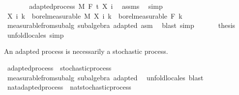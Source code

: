 \begin{isabellebody}
\ \ \ \ \isamarkupfalse%
\ \isamarkupfalse%
\ adapted{\isacharunderscore}{\kern0pt}process\ M\ F\ t\ {\isachardoublequoteopen}X\ i{\isachardoublequoteclose}\ \isamarkupfalse%
\ assms\ \isamarkupfalse%
\ simp\isanewline
\ \ \ \ \isamarkupfalse%
\ {\isachardoublequoteopen}X\ i\ k\ {\isasymin}\ borel{\isacharunderscore}{\kern0pt}measurable\ M{\isachardoublequoteclose}\ {\isachardoublequoteopen}X\ i\ k\ {\isasymin}\ borel{\isacharunderscore}{\kern0pt}measurable\ {\isacharparenleft}{\kern0pt}F\ k{\isacharparenright}{\kern0pt}{\isachardoublequoteclose}\ \isamarkupfalse%
\ measurable{\isacharunderscore}{\kern0pt}from{\isacharunderscore}{\kern0pt}subalg\ subalgebra\ adapted\ asm\ \isamarkupfalse%
\ {\isacharparenleft}{\kern0pt}blast{\isacharcomma}{\kern0pt}\ simp{\isacharparenright}{\kern0pt}\isanewline
\ \ \isacommand{{\isacharbraceright}{\kern0pt}}\isamarkupfalse%
\isanewline
\ \ \isamarkupfalse%
\ {\isacharquery}{\kern0pt}thesis\ \isamarkupfalse%
\ {\isacharparenleft}{\kern0pt}unfold{\isacharunderscore}{\kern0pt}locales{\isacharparenright}{\kern0pt}\ simp\isanewline
{}\isamarkupfalse%
%
\endisatagproof
{\isafoldproof}%
%
\isadelimproof
%
\endisadelimproof
%
\begin{isamarkuptext}%
An adapted process is necessarily a stochastic process.%
\end{isamarkuptext}\isamarkuptrue%
\isamarkupfalse%
\ adapted{\isacharunderscore}{\kern0pt}process\ {\isasymsubseteq}\ stochastic{\isacharunderscore}{\kern0pt}process%
\isadelimproof
\ %
\endisadelimproof
%
\isatagproof
{}\isamarkupfalse%
\ measurable{\isacharunderscore}{\kern0pt}from{\isacharunderscore}{\kern0pt}subalg\ subalgebra\ adapted\ \isamarkupfalse%
\ {\isacharparenleft}{\kern0pt}unfold{\isacharunderscore}{\kern0pt}locales{\isacharparenright}{\kern0pt}\ blast%
\endisatagproof
{\isafoldproof}%
%
\isadelimproof
%
\endisadelimproof
\isanewline
\isanewline
{}\isamarkupfalse%
\ nat{\isacharunderscore}{\kern0pt}adapted{\isacharunderscore}{\kern0pt}process\ {\isasymsubseteq}\ nat{\isacharunderscore}{\kern0pt}stochastic{\isacharunderscore}{\kern0pt}process%
\isadelimproof
\ %
\endisadelimproof
%
\isatagproof
\isacommand{{\isachardot}{\kern0pt}{\isachardot}{\kern0pt}}\isamarkupfalse%
%
\endisatagproof
{\isafoldproof}%
%
\isadelimproof
%
\endisadelimproof
\isanewline
{}\isamarkupfalse%

\end{isabellebody}
